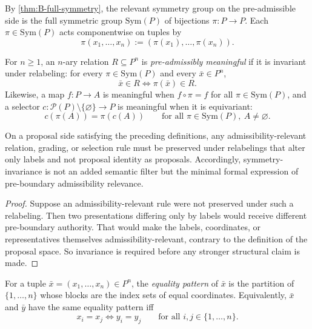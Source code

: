 \begin{definition}
By \cref{thm:B-full-symmetry}, the relevant symmetry group on the pre-admissible side is the full symmetric group $\mathrm{Sym}(P)$ of bijections $\pi:P\to P$. Each $\pi\in\mathrm{Sym}(P)$ acts componentwise on tuples by
\[
\pi(x_1,\dots,x_n):=(\pi(x_1),\dots,\pi(x_n)).
\]
\end{definition}

\begin{definition}
For $n\ge 1$, an $n$-ary relation $R\subseteq P^n$ is \emph{pre-admissibly meaningful} if it is invariant under relabeling: for every $\pi\in\mathrm{Sym}(P)$ and every $\bar x\in P^n$,
\[
\bar x\in R \Longleftrightarrow \pi(\bar x)\in R.
\]
Likewise, a map $f:P\to A$ is meaningful when $f\circ \pi=f$ for all $\pi\in\mathrm{Sym}(P)$, and a selector $c:\mathcal P(P)\setminus\{\varnothing\}\to P$ is meaningful when it is equivariant:
\[
c(\pi(A))=\pi(c(A)) \qquad \text{for all }\pi\in\mathrm{Sym}(P),\ A\neq\varnothing.
\]
\end{definition}

\begin{proposition}
\label{prop:B-invariance-minimal}
On a proposal side satisfying the preceding definitions, any admissibility-relevant relation, grading, or selection rule must be preserved under relabelings that alter only labels and not proposal identity as proposals. Accordingly, symmetry-invariance is not an added semantic filter but the minimal formal expression of pre-boundary admissibility relevance.
\end{proposition}

\begin{proof}
Suppose an admissibility-relevant rule were not preserved under such a relabeling. Then two presentations differing only by labels would receive different pre-boundary authority. That would make the labels, coordinates, or representatives themselves admissibility-relevant, contrary to the definition of the proposal space. So invariance is required before any stronger structural claim is made.
\end{proof}

\begin{definition}
For a tuple $\bar x=(x_1,\dots,x_n)\in P^n$, the \emph{equality pattern} of $\bar x$ is the partition of $\{1,\dots,n\}$ whose blocks are the index sets of equal coordinates. Equivalently, $\bar x$ and $\bar y$ have the same equality pattern iff
\[
x_i=x_j \Longleftrightarrow y_i=y_j \qquad \text{for all } i,j\in\{1,\dots,n\}.
\]
\end{definition}

